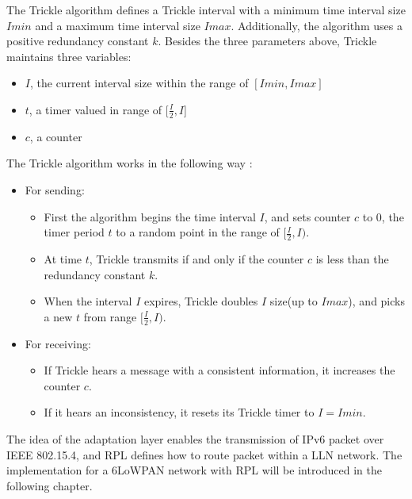 The Trickle algorithm defines a Trickle interval with a minimum time interval size $Imin$ and a maximum time interval size $Imax$. Additionally, the algorithm uses a positive redundancy constant $k$. Besides the three parameters above, Trickle maintains three variables:
\begin{itemize}
 \item $I$, the current interval size within the range of $[Imin, Imax]$
 \newline
 
 \item $t$, a timer valued in range of [$\frac{I}{2}, I$]
 \newline
 
 \item $c$, a counter
\end{itemize}

The Trickle algorithm works in the following way \cite{RFC 6206}:
\begin{itemize}
\item For sending:
  \begin{itemize}
  \item First the algorithm begins the time interval $I$, and sets counter $c$ to 0, the timer period $t$ to a random point in the range of $[\frac{I}{2}, I)$.
  
  \item At time $t$, Trickle transmits if and only if the counter $c$ is less than the redundancy constant $k$.
  
  \item When the interval $I$ expires, Trickle doubles $I$ size(up to $Imax$), and picks a new $t$ from range $[\frac{I}{2}, I)$. 
  \end{itemize}  
  
\item For receiving:
 \begin{itemize}
 \item If Trickle hears a message with a consistent information, it increases the counter $c$.
 
 \item If it hears an inconsistency, it resets its Trickle timer to $I=Imin$.
 \end{itemize}
\end{itemize}

The idea of the adaptation layer enables the transmission of IPv6 packet over IEEE 802.15.4, and RPL defines how to route packet within a LLN network. The implementation for a 6LoWPAN network with RPL will be introduced in the following chapter.






